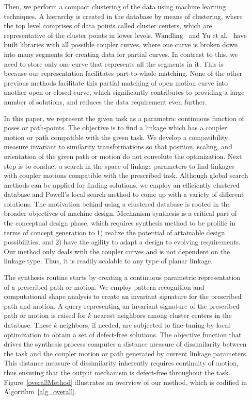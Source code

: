 \documentclass[twocolumn,10pt]{asme2ej}
\begin{document}
Then, we perform a compact clustering of the data using machine learning techniques.
A hierarchy is created in the database by means of clustering, where the top level comprises of data points called cluster centers, which are representative of the cluster points in lower levels.
Wandling~\cite{wandling2000} and Yu et al.~\cite{yue-pathgen2011} have built libraries with all possible coupler curves, where one curve is broken down into many segments for creating data for partial curves.
In contrast to this, we need to store only one curve that represents all the segments in it.
This is because our representation facilitates part-to-whole matching.
None of the other previous methods facilitate this partial matching of open motion curve into another open or closed curve, which significantly contributes to providing a large number of solutions, and reduces the data requirement even further.

In this paper, we represent the given task as a parametric continuous function of poses or path-points. The objective is to find a linkage which has a coupler motion or path compatible with the given task. We develop a compatibility measure invariant to similarity transformations so that position, scaling, and orientation of the given path or motion do not convolute the optimization.
Next step is to conduct a search in the space of linkage parameters to find linkages with coupler motions compatible with the prescribed task.
Although global search methods can be applied for finding solutions, we employ an efficiently clustered database and Powell's local search method to come up with a variety of different solutions.
The motivation behind using a clustered database is rooted in the broader objectives of machine design. Mechanism synthesis is a critical part of the conceptual design phase, which requires synthesis method to be prolific in terms of concept generation to 1) realize the potential of attainable design possibilities, and 2) have the agility to adapt a design to evolving requirements.
Our method only deals with the coupler curves and is not dependent on the linkage type.
Thus, it is readily scalable to any type of planar linkage.

The synthesis routine starts by creating a continuous parametric representation of a prescribed path or motion. We employ pattern recognition and computational shape analysis to create an invariant signature for the prescribed path and motion.
A query representing an invariant signature of the prescribed path or motion is raised for $k$ nearest neighbors among cluster centers in the database.
These $k$ neighbors, if needed, are subjected to fine-tuning by local optimization to obtain a set of defect-free solutions.
The objective function that drives the synthesis process computes a distance measure of dissimilarity between the task and the coupler motion or path generated by current linkage parameters.
This distance measure of dissimilarity inherently requires continuity of motion, thus ensuring that the output mechanism is defect-free throughout the task.
Figure~\ref{overallMethod} illustrates an overview of our method, which is codified in Algorithm~\ref{alg_overall}.
\end{document}

